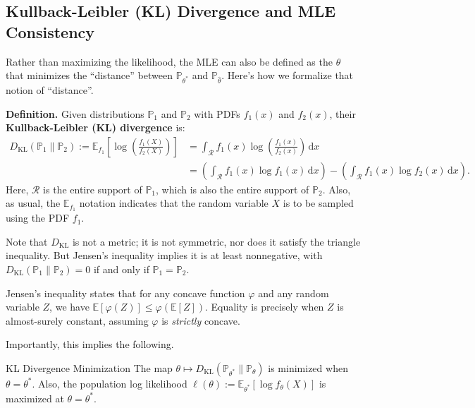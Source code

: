 \subsection{Kullback-Leibler (KL) Divergence and MLE Consistency}

Rather than maximizing the likelihood, the MLE can also be defined
as the $\theta$ that minimizes the ``distance'' between
$\mathbb{P}_{\theta^*}$ and $\mathbb{P}_{\hat{\theta}}$.
Here's how we formalize that notion of ``distance''.

\textbf{Definition.} Given distributions $\mathbb{P}_1$ and $\mathbb{P}_2$
with PDFs $f_1(x)$ and $f_2(x)$, their \textbf{Kullback-Leibler (KL) divergence} is:
\begin{align*} D_{\mathrm{KL}}(\mathbb{P}_1 \parallel \mathbb{P}_2) :=
\mathbb{E}_{f_1}\left[ \log\left(\frac{f_1(X)}{f_2(X)}\right)\right] & =
\int_{\mathcal{R}} f_1(x) \log \left(\frac{f_1(x)}{f_2(x)}\right) \, \mathrm{d}x \\ & =
\left( \int_{\mathcal{R}} f_1(x) \log f_1(x) \, \mathrm{d}x \right) - 
\left( \int_{\mathcal{R}} f_1(x) \log f_2(x) \, \mathrm{d}x \right). \end{align*}
Here, $\mathcal{R}$ is the entire support of $\mathbb{P}_1$,
which is also the entire support of $\mathbb{P}_2$.
Also, as usual, the $\mathbb{E}_{f_1}$ notation
indicates that the random variable $X$ is to be sampled using the PDF $f_1$.

Note that $D_{\mathrm{KL}}$ is not a metric; it is not symmetric, nor does it
satisfy the triangle inequality.  But Jensen's inequality implies it is at least nonnegative,
with $D_{\mathrm{KL}}(\mathbb{P}_1 \parallel \mathbb{P}_2) = 0$ if and only if
$\mathbb{P}_1 = \mathbb{P}_2$.

\begin{remark}
    Jensen's inequality states that
    for any concave function $\varphi$ and any random variable $Z$,
    we have $\mathbb{E}[\varphi(Z)] \leq \varphi(\mathbb{E}[Z])$.
    Equality is precisely when $Z$ is almost-surely constant,
    assuming $\varphi$ is \emph{strictly} concave.
\end{remark}

Importantly, this implies the following.

\begin{theorem}{KL Divergence Minimization}
    The map $\theta \mapsto
    D_{\mathrm{KL}}(\mathbb{P}_{\theta^*} \parallel \mathbb{P}_{\theta})$
    is minimized when $\theta = \theta^*$.
    Also, the population log likelihood
    $\ell(\theta) := \mathbb{E}_{\theta^*}[\log f_{\theta}(X)]$
    is maximized at $\theta = \theta^*$.
\end{theorem}


